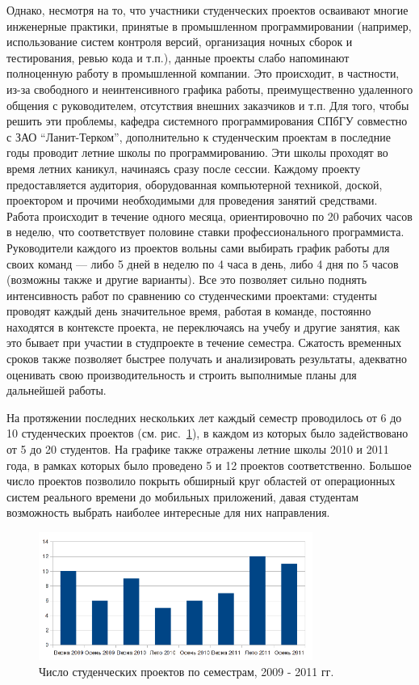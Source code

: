 \documentclass[a4paper]{article}
\begin{document}
Однако, несмотря на то, что участники студенческих проектов осваивают многие инженерные практики, принятые в промышленном программировании (например, использование систем контроля версий, организация ночных сборок и тестирования, ревью кода и т.п.), данные проекты слабо напоминают полноценную работу в промышленной компании. Это происходит, в частности, из-за свободного и неинтенсивного графика работы, преимущественно удаленного общения с руководителем, отсутствия внешних заказчиков и т.п. Для того, чтобы решить эти проблемы, кафедра системного программирования СПбГУ совместно с ЗАО ``Ланит-Терком'', дополнительно к студенческим проектам в последние годы проводит летние школы по программированию. Эти школы проходят во время летних каникул, начинаясь сразу после сессии. Каждому проекту предоставляется аудитория, оборудованная компьютерной техникой, доской, проектором и прочими необходимыми для проведения занятий средствами. Работа происходит в течение одного месяца, ориентировочно по 20 рабочих часов в неделю, что соответствует половине ставки профессионального программиста. Руководители каждого из проектов вольны сами выбирать график работы для своих команд ---  либо 5 дней в неделю по 4 часа в день, либо 4 дня по 5 часов (возможны также и другие варианты). Все это позволяет сильно поднять интенсивность работ по сравнению со студенческими проектами: студенты проводят каждый день значительное время, работая в команде, постоянно находятся в контексте проекта, не переключаясь на учебу и другие занятия, как это бывает при участии в студпроекте в течение семестра. Сжатость временных сроков также позволяет быстрее получать и анализировать результаты, адекватно оценивать свою производительность и строить выполнимые планы для дальнейшей работы. 

На протяжении последних нескольких лет каждый семестр проводилось от 6 до 10 студенческих проектов (см. рис.~\ref{projects}), в каждом из которых было задействовано от 5 до 20 студентов. На графике также отражены летние школы 2010 и 2011 года, в рамках которых было проведено 5 и 12 проектов соответственно. Большое число проектов позволило покрыть обширный круг областей от операционных систем реального времени до мобильных приложений, давая студентам возможность выбрать наиболее интересные для них направления.

\begin{figure} [ht]
  \begin{center}
    \includegraphics[width=0.8\textwidth]{01-projects.png}
    \caption{Число студенческих проектов по семестрам, 2009 - 2011 гг.}
    \label{projects}
  \end{center}
\end{figure}
\end{document}
